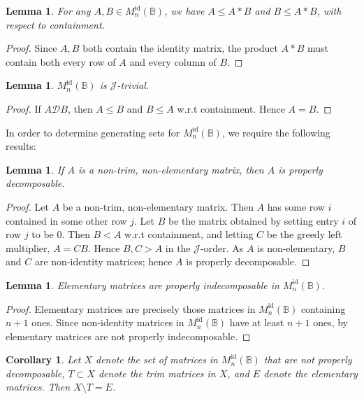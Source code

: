 \documentclass[11pt]{article}
\newtheorem{cor}[thm]{Corollary}
\newtheorem{lemma}[thm]{Lemma}
\numberwithin{equation}{section}
\newcommand{\B}{\mathbb{B}}
\newcommand{\Refn}{M_n^{\text{id}}(\B)}
\newcommand{\D}{\mathscr{D}}
\newcommand{\J}{\mathscr{J}}
\begin{document}
\begin{lemma}
  For any $A, B \in \Refn$, we have $A \leq A * B$ and $B \leq A * B$, with
  respect to containment.
\end{lemma}
\begin{proof}
  Since $A, B$ both contain the identity matrix, the product $A * B$ must
  contain both every row of $A$ and every column of $B$.
\end{proof}

\begin{lemma}
  $\Refn$ is $\J$-trivial. 
\end{lemma}
\begin{proof}
  If $A \D B$, then $A \leq B$ and $B \leq A$ w.r.t containment. Hence $A = B$.    
\end{proof}

In order to determine generating sets for $\Refn$, we require the following results:


\begin{lemma}
  If $A$ is a non-trim, non-elementary matrix, then $A$ is properly
  decomposable.
\end{lemma}
\begin{proof}
Let $A$ be a non-trim, non-elementary matrix. Then $A$ has some row $i$
contained in some other row $j$. Let $B$ be the matrix obtained by setting entry
$i$ of row $j$ to be $0$. Then $B < A$ w.r.t containment, and letting $C$ be the
greedy left multiplier, $A = CB$. Hence $B, C > A$ in the $\J$-order. As $A$ is
non-elementary, $B$ and $C$ are non-identity matrices; hence $A$ is properly
decomposable.
\end{proof}

\begin{lemma}
  Elementary matrices are properly indecomposable in $\Refn$.
\end{lemma}
\begin{proof}
  Elementary matrices are precisely those matrices in $\Refn$ containing $n + 1$
  ones. Since non-identity matrices in $\Refn$ have at least $n + 1$ ones, by
   elementary matrices are not properly
  indecomposable.
\end{proof}

\begin{cor}
  Let $X$ denote the set of matrices in $\Refn$ that are not properly
  decomposable, $T \subset X$ denote the trim matrices in $X$, and $E$ denote
  the elementary matrices. Then $X \setminus T = E$. 
\end{cor}
\end{document}
